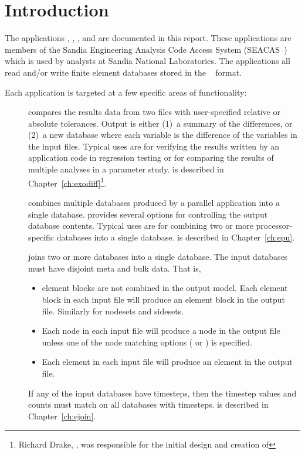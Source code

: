 \chapter{Introduction}

The applications \exodiff{}, \epu{}, \ejoin{}, and \conjoin{} are
documented in this report.  These applications are members of the
Sandia Engineering Analysis Code Access System (SEACAS~\cite{bib:seacas})
which is used by analysts at Sandia National Laboratories.  The
applications all read and/or write finite element databases stored in
the \exo{}~\cite{bib:exodus} format.

Each application is targeted at a few specific areas of functionality:

\begin{description}
\item[\exodiff] compares the results data from two \exo{} files with
user-specified relative or absolute tolerances. Output is either (1)~a
summary of the differences, or (2)~a new \exo{} database where each
variable is the difference of the variables in the input files.
Typical uses are for verifying the results written by an application
code in regression testing or for comparing the results of multiple
analyses in a parameter study. \exodiff{} is described in
Chapter~\ref{ch:exodiff}\footnote{Richard Drake, \SNLA, was
responsible for the initial design and creation of \exodiff}.

\item[\epu] combines multiple \exo{} databases produced by a parallel
application into a single \exo{} database.  \epu{} provides several
options for controlling the output database contents.  Typical uses
are for combining two or more processor-specific \exo{} databases into
a single \exo{} database.
\epu{} is described in Chapter~\ref{ch:epu}.

\item[\ejoin] joins two or more \exo{} databases into a single
\exo{} database. The input databases must have disjoint meta and bulk data.
That is,
\begin{itemize}
\item element blocks are not combined in the output model.  Each
element block in each input file will produce an element block in the
output file. Similarly for nodesets and sidesets.
\item Each node in each input file will produce a node in the output
file unless one of the node matching options
( or ) is specified.
\item Each element in each input file will produce an element in the
output file.
\end{itemize}
If any of the input databases have timesteps, then the timestep values
and counts must match on all databases with timesteps.
\ejoin{} is described in Chapter~\ref{ch:ejoin}.


\end{description}
